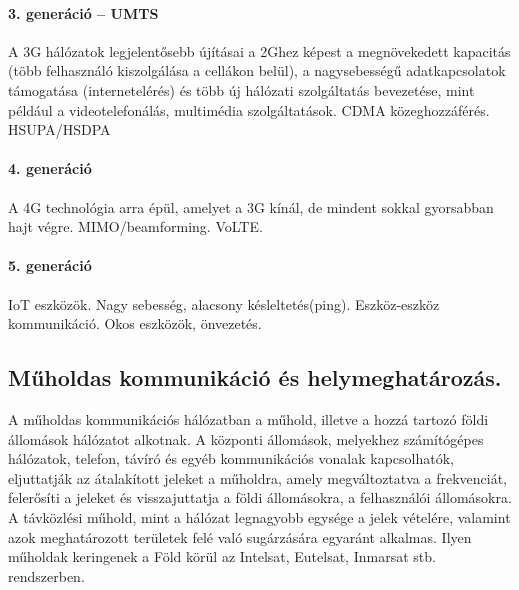 \paragraph{3. generáció -- UMTS}
A 3G hálózatok legjelentősebb újításai a 2Ghez képest a megnövekedett kapacitás (több felhasználó kiszolgálása a cellákon belül), a nagysebességű adatkapcsolatok támogatása (internetelérés) és több új hálózati szolgáltatás bevezetése, mint például a videotelefonálás, multimédia szolgáltatások. CDMA közeghozzáférés. HSUPA/HSDPA

\paragraph{4. generáció}
A 4G technológia arra épül, amelyet a 3G kínál, de mindent sokkal gyorsabban hajt végre. MIMO/beamforming. VoLTE.

\paragraph{5. generáció}
IoT eszközök. Nagy sebesség, alacsony késleltetés(ping). Eszköz-eszköz kommunikáció. Okos eszközök, önvezetés.

\subsection{Műholdas kommunikáció és helymeghatározás.}
A műholdas kommunikációs hálózatban a műhold, illetve a hozzá tartozó földi
állomások hálózatot alkotnak. A központi állomások, melyekhez számítógépes
hálózatok, telefon, távíró és egyéb kommunikációs vonalak kapcsolhatók,
eljuttatják az átalakított jeleket a műholdra, amely megváltoztatva a frekvenciát, felerősíti a jeleket és visszajuttatja a földi állomásokra, a felhasználói állomásokra. A távközlési műhold, mint a hálózat legnagyobb egysége a jelek vételére, valamint azok meghatározott területek felé való sugárzására egyaránt alkalmas. Ilyen műholdak keringenek a Föld körül az Intelsat, Eutelsat, Inmarsat stb. rendszerben. 

